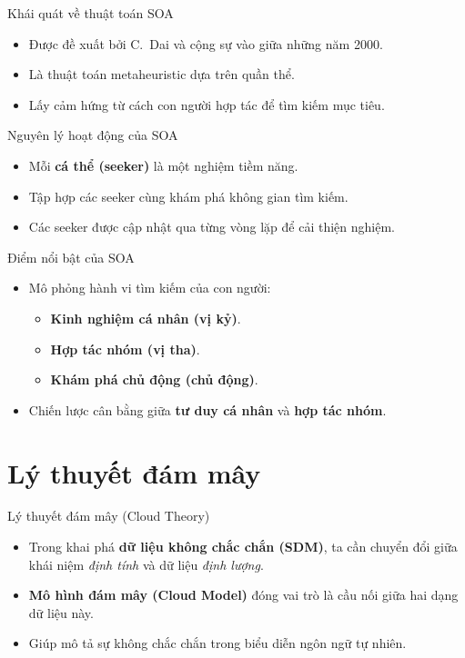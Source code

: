\documentclass[10pt]{beamer}
\begin{document}
\begin{frame}{Khái quát về thuật toán SOA}
\begin{itemize}
    \item Được đề xuất bởi C.~Dai và cộng sự vào giữa những năm 2000.
    \item Là thuật toán metaheuristic dựa trên quần thể.
    \item Lấy cảm hứng từ cách con người hợp tác để tìm kiếm mục tiêu.
\end{itemize}
\end{frame}

\begin{frame}{Nguyên lý hoạt động của SOA}
\begin{itemize}
    \item Mỗi \textbf{cá thể (seeker)} là một nghiệm tiềm năng.
    \item Tập hợp các seeker cùng khám phá không gian tìm kiếm.
    \item Các seeker được cập nhật qua từng vòng lặp để cải thiện nghiệm.
\end{itemize}
\end{frame}

\begin{frame}{Điểm nổi bật của SOA}
\begin{itemize}
    \item Mô phỏng hành vi tìm kiếm của con người:
    \begin{itemize}
        \item \textbf{Kinh nghiệm cá nhân (vị kỷ)}.
        \item \textbf{Hợp tác nhóm (vị tha)}.
        \item \textbf{Khám phá chủ động (chủ động)}.
    \end{itemize}
    \item Chiến lược cân bằng giữa \textbf{tư duy cá nhân} và \textbf{hợp tác nhóm}.
\end{itemize}
\end{frame}

\section{Lý thuyết đám mây}

\begin{frame}{Lý thuyết đám mây (Cloud Theory)}
\begin{itemize}
    \item Trong khai phá \textbf{dữ liệu không chắc chắn (SDM)}, ta cần chuyển đổi giữa khái niệm \textit{định tính} và dữ liệu \textit{định lượng}.
    \item \textbf{Mô hình đám mây (Cloud Model)} đóng vai trò là cầu nối giữa hai dạng dữ liệu này.
    \item Giúp mô tả sự không chắc chắn trong biểu diễn ngôn ngữ tự nhiên.
\end{itemize}
\end{frame}
\end{document}
